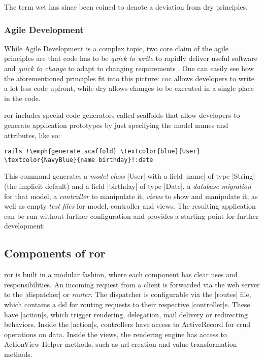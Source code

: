The term \acrfull{wet} has since been coined to denote a deviation from \gls{dry} principles. \citep{wet}

\subsubsection{Agile Development}
\label{subsub:agile}

While Agile Development is a complex topic, two core claim of the agile principles are that code has to be \emph{quick to write} to rapidly deliver useful software \citep[Principle 1]{martin2003agile} and \emph{quick to change} to adapt to changing requirements \citep[Principle 2]{martin2003agile}. One can easily see how the aforementioned principles fit into this picture: \acrshort{coc} allows developers to write a lot less code upfront, while \acrshort{dry} allows changes to be executed in a single place in the code.

\gls{ror} includes special code generators called \gls{scaffold}s that allow developers to generate application prototypes by just specifying the model names and attributes, like so:

\begin{lstlisting}[escapechar=!]
  rails !\emph{generate scaffold} \textcolor{blue}{User} \textcolor{NavyBlue}{name birthday}!:date
\end{lstlisting}

This command generates a \emph{model class} |User| with a field |name| of type |String| (the implicit default) and a field |birthday| of type |Date|, a \emph{database migration} for that model, a \emph{controller} to manipulate it, \emph{views} to show and manipulate it, as well as empty \emph{test files} for model, controller and views. The resulting application can be run without further configuration and provides a starting point for further development:


\subsection{Components of \acrlong{ror}}


\gls{ror} is built in a modular fashion, where each component has clear uses and responsibilities.
An incoming request from a client is forwarded via the web server to the |dispatcher| or \emph{router}. The dispatcher is configurable via the |routes| file, which contains a \gls{dsl} for routing requests to their respective |controller|s. These have |action|s, which trigger rendering, delegation, mail delivery or redirecting behaviors. Inside the |action|s, controllers have access to ActiveRecord for \gls{crud} operations on data. Inside the views, the rendering engine has access to ActionView Helper methods, such as url creation and value transformation methods.

